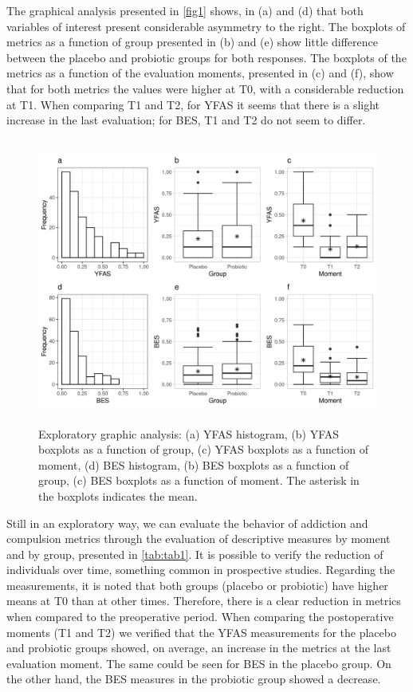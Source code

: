 \documentclass[Review,sagev,times, doublespace]{sagej}
\begin{document}

The graphical analysis presented in \autoref{fig1} shows, in (a) and (d) that both variables of interest present considerable asymmetry to the right. The boxplots of metrics as a function of group presented in (b) and (e) show little difference between the placebo and probiotic groups for both responses. The boxplots of the metrics as a function of the evaluation moments, presented in (c) and (f), show that for both metrics the values were higher at T0, with a considerable reduction at T1. When comparing T1 and T2, for YFAS it seems that there is a slight increase in the last evaluation; for BES, T1 and T2 do not seem to differ.  

\begin{figure}[h]
\centering
\includegraphics[width=29.6pc,height=22.2pc]{FIGURE1.jpeg}
\caption{Exploratory graphic analysis: (a) YFAS histogram, (b) YFAS boxplots as a function of group, (c) YFAS boxplots as a function of moment, (d) BES histogram, (b) BES boxplots as a function of group, (c) BES boxplots as a function of moment. The asterisk in the boxplots indicates the mean.\label{fig1}}
\end{figure}

Still in an exploratory way, we can evaluate the behavior of addiction and compulsion metrics through the evaluation of descriptive measures by moment and by group, presented in \autoref{tab:tab1}. It is possible to verify the reduction of individuals over time, something common in prospective studies. Regarding the measurements, it is noted that both groups (placebo or probiotic) have higher means at T0 than at other times. Therefore, there is a clear reduction in metrics when compared to the preoperative period. When comparing the postoperative moments (T1 and T2) we verified that the YFAS measurements for the placebo and probiotic groups showed, on average, an increase in the metrics at the last evaluation moment. The same could be seen for BES in the placebo group. On the other hand, the BES measures in the probiotic group showed a decrease.
\end{document}
